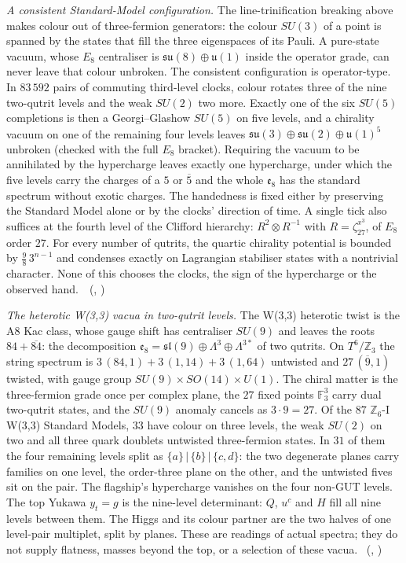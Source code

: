 \emph{A consistent Standard-Model configuration.} The line-trinification breaking above makes colour out of three-fermion
generators: the colour $SU(3)$ of a point is spanned by the states that fill the three eigenspaces of its Pauli. A pure-state
vacuum, whose $E_8$ centraliser is $\mathfrak{su}(8)\oplus\mathfrak u(1)$ inside the operator grade, can never leave that colour
unbroken. The consistent configuration is operator-type. In $83\,592$ pairs of commuting third-level clocks, colour rotates three
of the nine two-qutrit levels and the weak $SU(2)$ two more. Exactly one of the six $SU(5)$ completions is then a Georgi--Glashow
$SU(5)$ on five levels, and a chirality vacuum on one of the remaining four levels leaves
$\mathfrak{su}(3)\oplus\mathfrak{su}(2)\oplus\mathfrak u(1)^5$ unbroken (checked with the full $E_8$ bracket). Requiring the vacuum to
be annihilated by the hypercharge leaves exactly one hypercharge, under which the five levels carry the charges of a $5$ or
$\overline5$ and the whole $\mathfrak e_8$ has the standard spectrum without exotic charges. The handedness is fixed either by
preserving the Standard Model alone or by the clocks' direction of time. A single tick also suffices at the fourth level of the
Clifford hierarchy: $R^2\otimes R^{-1}$ with $R=\zeta_{27}^{x^3}$, of $E_8$ order $27$. For every number of qutrits, the quartic
chirality potential is bounded by $\tfrac98\,3^{n-1}$ and condenses exactly on Lagrangian stabiliser states with a nontrivial
character. None of this chooses the clocks, the sign of the hypercharge or the observed hand.
\tierT\,\tierC\ (,
)

\emph{The heterotic W(3,3) vacua in two-qutrit levels.} The W(3,3) heterotic twist is the A8 Kac class, whose gauge shift
has centraliser $SU(9)$ and leaves the roots $84+\overline{84}$: the decomposition
$\mathfrak e_8=\mathfrak{sl}(9)\oplus\Lambda^3\oplus\Lambda^{3*}$ of two qutrits. On $T^6/\mathbb Z_3$ the string spectrum is
$3\,(84,1)+3\,(1,14)+3\,(1,64)$ untwisted and $27\,(\overline9,1)$ twisted, with gauge group $SU(9)\times SO(14)\times U(1)$.
The chiral matter is the three-fermion grade once per complex plane, the $27$ fixed points $\mathbb F_3^3$ carry dual
two-qutrit states, and the $SU(9)$ anomaly cancels as $3\cdot9=27$. Of the $87$ $\mathbb Z_6$-I W(3,3) Standard Models, $33$
have colour on three levels, the weak $SU(2)$ on two and all three quark doublets untwisted three-fermion states. In $31$
of them the four remaining levels split as $\{a\}\,|\,\{b\}\,|\,\{c,d\}$: the two degenerate planes carry families on one level,
the order-three plane on the other, and the untwisted fives sit on the pair. The flagship's hypercharge vanishes on the four
non-GUT levels. The top Yukawa $y_t=g$ is the nine-level determinant: $Q$, $u^c$ and $H$ fill all nine levels between them.
The Higgs and its colour partner are the two halves of one level-pair multiplet, split by planes. These are readings of
actual spectra; they do not supply flatness, masses beyond the top, or a selection of these vacua.
\tierC\ (,
)


